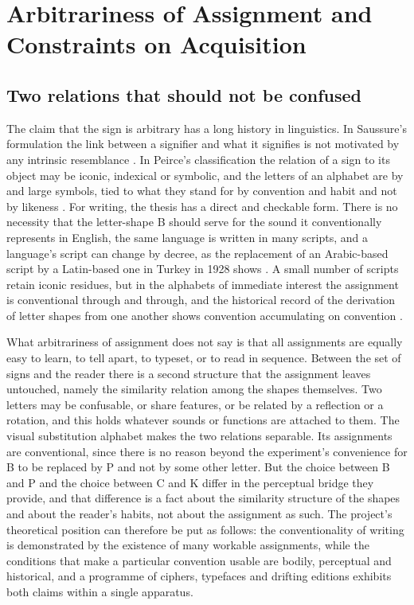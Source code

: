 \section{Arbitrariness of Assignment and Constraints on Acquisition}\label{sec:arb}

\subsection{Two relations that should not be confused}

The claim that the sign is arbitrary has a long history in linguistics. In Saussure's formulation the link between a signifier and what it signifies is not motivated by any intrinsic resemblance \citep{saussure1983}. In Peirce's classification the relation of a sign to its object may be iconic, indexical or symbolic, and the letters of an alphabet are by and large symbols, tied to what they stand for by convention and habit and not by likeness \citep{peirce1931}. For writing, the thesis has a direct and checkable form. There is no necessity that the letter-shape B should serve for the sound it conventionally represents in English, the same language is written in many scripts, and a language's script can change by decree, as the replacement of an Arabic-based script by a Latin-based one in Turkey in 1928 shows \citep{lewis1999}. A small number of scripts retain iconic residues, but in the alphabets of immediate interest the assignment is conventional through and through, and the historical record of the derivation of letter shapes from one another shows convention accumulating on convention \citep{gelb1952,daniels1996}.

What arbitrariness of assignment does not say is that all assignments are equally easy to learn, to tell apart, to typeset, or to read in sequence. Between the set of signs and the reader there is a second structure that the assignment leaves untouched, namely the similarity relation among the shapes themselves. Two letters may be confusable, or share features, or be related by a reflection or a rotation, and this holds whatever sounds or functions are attached to them. The visual substitution alphabet makes the two relations separable. Its assignments are conventional, since there is no reason beyond the experiment's convenience for B to be replaced by P and not by some other letter. But the choice between B and P and the choice between C and K differ in the perceptual bridge they provide, and that difference is a fact about the similarity structure of the shapes and about the reader's habits, not about the assignment as such. The project's theoretical position can therefore be put as follows: the conventionality of writing is demonstrated by the existence of many workable assignments, while the conditions that make a particular convention usable are bodily, perceptual and historical, and a programme of ciphers, typefaces and drifting editions exhibits both claims within a single apparatus.

